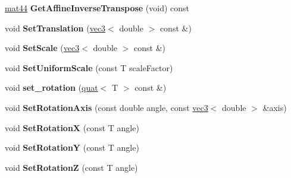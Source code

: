 \begin{DoxyCompactItemize}
\item 
\hypertarget{classmath_1_1mat44_a5a619a1605d048b1e01d904cd0dc31d7}{
\hyperlink{classmath_1_1mat44}{mat44} {\bfseries GetAffineInverseTranspose} (void) const }
\label{classmath_1_1mat44_a5a619a1605d048b1e01d904cd0dc31d7}

\item 
\hypertarget{classmath_1_1mat44_a47696d5728bb8a42d4e38923b3be9708}{
void {\bfseries SetTranslation} (\hyperlink{classmath_1_1vec3}{vec3}$<$ double $>$ const \&)}
\label{classmath_1_1mat44_a47696d5728bb8a42d4e38923b3be9708}

\item 
\hypertarget{classmath_1_1mat44_a311b3320b1cbaaeb2189b2db1883fec7}{
void {\bfseries SetScale} (\hyperlink{classmath_1_1vec3}{vec3}$<$ double $>$ const \&)}
\label{classmath_1_1mat44_a311b3320b1cbaaeb2189b2db1883fec7}

\item 
\hypertarget{classmath_1_1mat44_a6a0d5ddb6df2dc6568f0d6a95f302d3b}{
void {\bfseries SetUniformScale} (const T scaleFactor)}
\label{classmath_1_1mat44_a6a0d5ddb6df2dc6568f0d6a95f302d3b}

\item 
\hypertarget{classmath_1_1mat44_a7f7ea68fd2c7b30804204cc70d713d52}{
void {\bfseries set\_\-rotation} (\hyperlink{classmath_1_1quat}{quat}$<$ T $>$ const \&)}
\label{classmath_1_1mat44_a7f7ea68fd2c7b30804204cc70d713d52}

\item 
\hypertarget{classmath_1_1mat44_a157b37473ff94c7487d69d0f72c14f5a}{
void {\bfseries SetRotationAxis} (const double angle, const \hyperlink{classmath_1_1vec3}{vec3}$<$ double $>$ \&axis)}
\label{classmath_1_1mat44_a157b37473ff94c7487d69d0f72c14f5a}

\item 
\hypertarget{classmath_1_1mat44_a8a3e080f62685e9df01d1fb07249d11d}{
void {\bfseries SetRotationX} (const T angle)}
\label{classmath_1_1mat44_a8a3e080f62685e9df01d1fb07249d11d}

\item 
\hypertarget{classmath_1_1mat44_a55e437444524b0a3d2273ca5987d59be}{
void {\bfseries SetRotationY} (const T angle)}
\label{classmath_1_1mat44_a55e437444524b0a3d2273ca5987d59be}

\item 
\hypertarget{classmath_1_1mat44_a5707e8c3e1f52ba05809b210103bbe8a}{
void {\bfseries SetRotationZ} (const T angle)}
\label{classmath_1_1mat44_a5707e8c3e1f52ba05809b210103bbe8a}


\end{DoxyCompactItemize}
